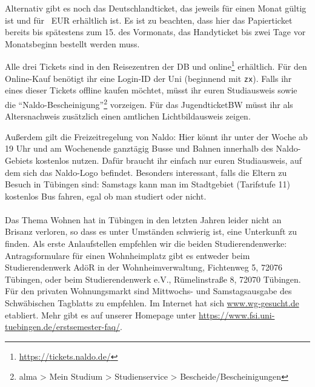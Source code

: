    Alternativ gibt es noch das Deutschlandticket, das jeweils für einen Monat gültig ist und für \detickettuepreis~EUR erhältlich ist. 
    Es ist zu beachten, dass hier das Papierticket bereits bis spätestens zum 15. des Vormonats, das Handyticket bis zwei Tage vor Monatsbeginn bestellt werden muss.

    Alle drei Tickets sind in den Reisezentren der DB und online\footnote{\url{https://tickets.naldo.de/}} erhältlich. Für den Online-Kauf benötigt ihr eine Login-ID der Uni (beginnend mit \texttt{zx}). Falls ihr eines dieser Tickets offline kaufen möchtet, müsst ihr euren Studiausweis
    sowie die "`Naldo-Bescheinigung"'\footnote{alma > Mein Studium > Studienservice > Bescheide/Bescheinigungen} vorzeigen. Für das JugendticketBW müsst ihr als Altersnachweis zusätzlich einen amtlichen Lichtbildausweis zeigen. 
    
    Außerdem gilt die Freizeitregelung von Naldo: Hier könnt ihr unter der Woche ab 19 Uhr und am Wochenende ganztägig Busse und Bahnen innerhalb des Naldo-Gebiets kostenlos nutzen. Dafür braucht ihr einfach nur euren Studiausweis, auf dem sich das Naldo-Logo befindet.
    Besonders interessant, falls die Eltern zu Besuch in Tübingen sind: Samstags kann man im Stadtgebiet (Tarifstufe 11) kostenlos Bus fahren, egal ob man studiert oder nicht. \\\\

    Das Thema Wohnen hat in Tübingen in den letzten Jahren leider nicht an Brisanz verloren, so dass
    es unter Umständen schwierig ist, eine Unterkunft zu finden. Als erste Anlaufstellen empfehlen wir
    die beiden Studierendenwerke: Antragsformulare für einen Wohnheimplatz gibt es entweder beim
    Studierendenwerk AdöR in der Wohnheimverwaltung, Fichtenweg 5, 72076 Tübingen, oder beim Studierendenwerk
    e.V., Rümelinstraße 8, 72070 Tübingen. Für den privaten Wohnungsmarkt sind Mittwochs- und Samstagsausgabe
    des Schwäbischen Tagblatts zu empfehlen.
    Im Internet hat sich \url{www.wg-gesucht.de} etabliert. Mehr gibt es auf unserer Homepage unter \url{https://www.fsi.uni-tuebingen.de/erstsemester-faq/}.
    \fi
